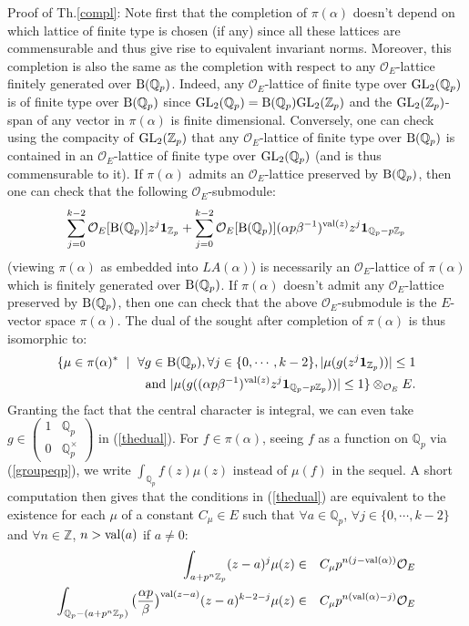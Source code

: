 \documentclass[11pt]{amsart}
\def\Z{{\mathbb Z}_p}
\def\Q{{\mathbb Q}_p}
\def\G{{\rm GL}_2(\Q)}
\def\K{{\rm GL}_2(\Z)}
\def\B{{\rm B}(\Q)}
\def\O{{\mathcal O}_E}
\begin{document}
Proof of Th.\ref{compl}: Note first that the completion of
$\pi(\alpha)$ doesn't depend on which lattice of finite type is chosen
(if any) since all these lattices are commensurable and thus give rise
to equivalent invariant norms. Moreover, this completion is also the
same as the completion with respect to any $\O$-lattice finitely
generated over $\B$. Indeed, any $\O$-lattice of finite type over $\G$
is of finite type over $\B$ since $\G=\B\K$ and the $\K$-span of any
vector in $\pi(\alpha)$ is finite dimensional. Conversely, one can
check using the compacity of $\K$ that any $\O$-lattice of finite type
over $\B$ is contained in an $\O$-lattice of finite type over $\G$ (and is
thus commensurable to it). If $\pi(\alpha)$ admits an $\O$-lattice
preserved by $\B$, then one can check that the following
$\O$-submodule:  
$$\sum_{j=0}^{k-2}\O[\B]z^j{\mathbf 1}_{\Z}+\sum_{j=0}^{k-2}
\O[\B](\alpha p\beta^{-1})^{{\rm val}(z)}z^j{\mathbf 1}_{\Q-p\Z}$$ 
(viewing $\pi(\alpha)$ as embedded into $LA(\alpha)$) is necessarily
an $\O$-lattice of $\pi(\alpha)$ which is finitely generated over
$\B$. If $\pi(\alpha)$ doesn't admit any $\O$-lattice preserved by
$\B$, then one can check that the above $\O$-submodule is the
$E$-vector space $\pi(\alpha)$. The dual of the sought after
completion of $\pi(\alpha)$ is thus isomorphic to:  
\begin{eqnarray}\label{thedual} 
\{\mu\in \pi(\alpha)^*\ \mid\ \forall g\in\B, \forall j\in
\{0,\cdots,k-2\}, |\mu(g(z^j{\mathbf 1}_{\Z}))|\leq 1\\   
\nonumber {\rm and}\ |\mu(g((\alpha p\beta^{-1})^{{\rm
    val}(z)}z^j{\mathbf 1}_{\Q-p\Z}))|\leq 1\}\otimes_{\O}E.  
\end{eqnarray} 
Granting the fact that the central character is integral, we can even
take $g\in \begin{pmatrix}1&\Q \\0&\Q^{\times}\end{pmatrix}$ in
(\ref{thedual}). For $f\in \pi(\alpha)$, seeing $f$ as a function on
$\Q$ via (\ref{groupeqp}), we write $\int_{\Q}f(z)\mu(z)$ instead of
$\mu(f)$ in the sequel. A short computation then gives that the
conditions in (\ref{thedual}) are equivalent to the existence for each
$\mu$ of a constant $C_{\mu}\in E$ such that $\forall a\in \Q$,
$\forall j\in \{0,\cdots,k-2\}$ and $\forall n\in {\mathbb Z}$,
$n>{\rm val}(a)$ if $a\ne 0$:  
\begin{eqnarray}\label{chaud1} 
\int_{a+p^n\Z}(z-a)^j\mu(z)&\in & C_{\mu}p^{n(j-{\rm
    val}(\alpha))}\O\\  
\label{chaud2}\int_{\Q-(a+p^n\Z)}\big(\frac{\alpha
  p}{\beta}\big)^{{\rm val}(z-a)}(z-a)^{k-2-j}\mu(z)&\in &
C_{\mu}p^{n({\rm val}(\alpha)-j)}\O  
\end{eqnarray} 
\end{document}
